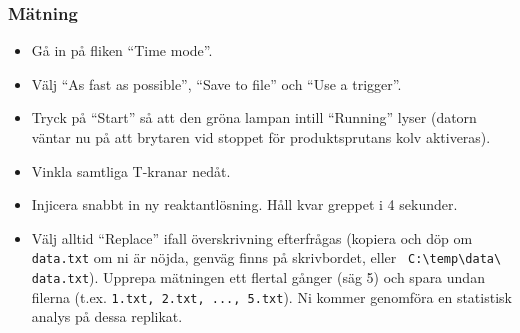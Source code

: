 {\subsubsection{Mätning}
\begin{itemize}
\item Gå in på fliken ``Time mode''.
\item Välj ``As fast as possible'', ``Save to file'' och ``Use a trigger''.
\item Tryck på ``Start'' så att den gröna lampan intill ``Running'' lyser
  (datorn väntar nu på att brytaren vid stoppet för produktsprutans kolv aktiveras).
\item Vinkla samtliga T-kranar nedåt.
\item Injicera snabbt in ny reaktantlösning. Håll kvar greppet i 4 sekunder.
\item Välj alltid ``Replace'' ifall överskrivning efterfrågas (kopiera
  och döp om {\tt data.txt} om ni är nöjda, genväg finns på skrivbordet, eller {\tt
    C:\textbackslash temp\textbackslash data\textbackslash
    data.txt}). Upprepa mätningen ett flertal gånger (säg 5) och spara
  undan filerna (t.ex. {\tt 1.txt, 2.txt, ..., 5.txt}). Ni kommer
  genomföra en statistisk analys på dessa replikat.
\end{itemize}
}
